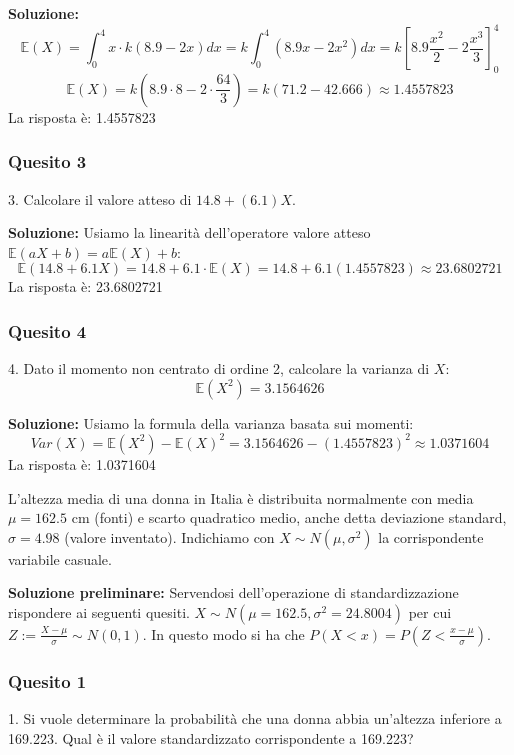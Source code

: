 \documentclass[12pt, a4paper]{article}
\begin{document}
\textbf{Soluzione:}
$$ \mathbb{E}(X) = \int_0^4 x \cdot k(8.9 - 2x) dx = k \int_0^4 (8.9x - 2x^2) dx = k \left[ 8.9 \frac{x^2}{2} - 2 \frac{x^3}{3} \right]_0^4 $$
$$ \mathbb{E}(X) = k \left( 8.9 \cdot 8 - 2 \cdot \frac{64}{3} \right) = k (71.2 - 42.666) \approx 1.4557823 $$
La risposta è: 1.4557823

\subsubsection*{Quesito 3}
3. Calcolare il valore atteso di $14.8 + (6.1)X$.

\textbf{Soluzione:}
Usiamo la linearità dell'operatore valore atteso $\mathbb{E}(aX+b) = a\mathbb{E}(X)+b$:
$$ \mathbb{E}(14.8 + 6.1X) = 14.8 + 6.1 \cdot \mathbb{E}(X) = 14.8 + 6.1(1.4557823) \approx 23.6802721 $$
La risposta è: 23.6802721

\subsubsection*{Quesito 4}
4. Dato il momento non centrato di ordine 2, calcolare la varianza di $X$:
$$ \mathbb{E}(X^2) = 3.1564626 $$

\textbf{Soluzione:}
Usiamo la formula della varianza basata sui momenti:
$$ Var(X) = \mathbb{E}(X^2) - \mathbb{E}(X)^2 = 3.1564626 - (1.4557823)^2 \approx 1.0371604 $$
La risposta è: 1.0371604


\vspace{0.5cm}
\begin{tcolorbox}[colback=lightergray!10, colframe=tocsec, title=\textbf{Esercizio 10}]
L’altezza media di una donna in Italia è distribuita normalmente con media $\mu=162.5$ cm (fonti) e scarto quadratico medio, anche detta deviazione standard, $\sigma=4.98$ (valore inventato). Indichiamo con $X \sim N(\mu, \sigma^2)$ la corrispondente variabile casuale.
\end{tcolorbox}

\vspace{0.3cm}
\textbf{Soluzione preliminare:} Servendosi dell’operazione di standardizzazione rispondere ai seguenti quesiti. 
$X \sim N(\mu=162.5, \sigma^2=24.8004)$ per cui $Z := \frac{X-\mu}{\sigma} \sim N(0,1)$. In questo modo si ha che $P(X < x) = P\left(Z < \frac{x-\mu}{\sigma}\right)$.

\subsubsection*{Quesito 1}
1. Si vuole determinare la probabilità che una donna abbia un’altezza inferiore a 169.223. Qual è il valore standardizzato corrispondente a 169.223?
\end{document}
